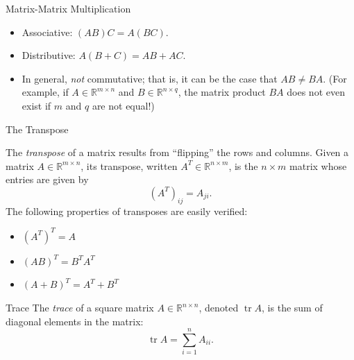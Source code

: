 \documentclass[aspectratio=169,12pt]{beamer}
\DeclareMathOperator{\tr}{tr}
\begin{document}
\begin{frame}[t]{Matrix-Matrix Multiplication}
  \vspace{0.45cm}
  {\large
  \begin{itemize}
    \setlength{\itemsep}{0.43cm}
    \item Associative: $(AB)C=A(BC)$.
    \item Distributive: $A(B+C)=AB+AC$.
    \item In general, \emph{not} commutative; that is, it can be the case that
          $AB\ne BA$. (For example, if $A\in\mathbb{R}^{m\times n}$ and
          $B\in\mathbb{R}^{n\times q}$, the matrix product $BA$ does not even
          exist if $m$ and $q$ are not equal!)
  \end{itemize}
  }
\end{frame}

\begin{frame}[t]{The Transpose}
  \vspace{0.20cm}
  {\small
  The \emph{transpose} of a matrix results from ``flipping'' the rows and columns.
  Given a matrix $A\in\mathbb{R}^{m\times n}$, its transpose, written
  $A^T\in\mathbb{R}^{n\times m}$, is the $n\times m$ matrix whose entries are
  given by
  \[
    (A^T)_{ij}=A_{ji}.
  \]
  The following properties of transposes are easily verified:
  \begin{itemize}
    \setlength{\itemsep}{0.18cm}
    \item $(A^T)^T=A$
    \item $(AB)^T=B^TA^T$
    \item $(A+B)^T=A^T+B^T$
  \end{itemize}
  }
\end{frame}

\begin{frame}[t]{Trace}
  \vspace{1.05cm}
  {\large
  The \emph{trace} of a square matrix $A\in\mathbb{R}^{n\times n}$, denoted
  $\tr A$, is the sum of diagonal elements in the matrix:
  \[
    \tr A=\sum_{i=1}^{n}A_{ii}.
  \]
  }
\end{frame}
\end{document}
